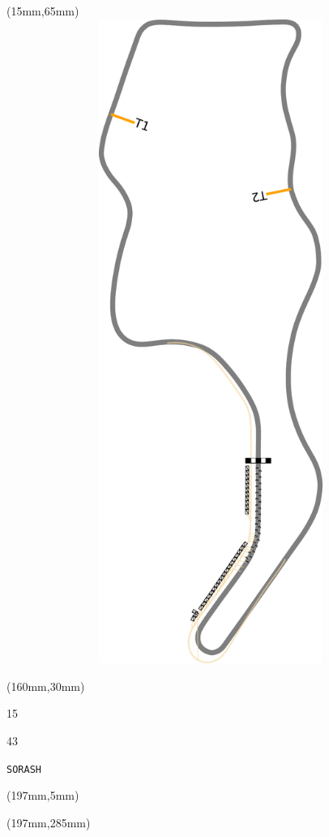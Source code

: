 \begin{textblock*}{185mm}(15mm,65mm)%
\centering
\mbox{\includegraphics[width=185mm,height=210mm,keepaspectratio]{PT/SORASH.pdf}}
\end{textblock*}
\begin{textblock*}{40mm}(160mm,30mm)%
\Large
\par{} 
\par15 
\par43 
\par\hfill\tiny\tt SORASH\\
\end{textblock*}
\begin{textblock*}{20mm}(197mm,5mm)%
\fbox{\thepage}
\label{SORASH}
\end{textblock*}
\begin{textblock*}{20mm}(197mm,285mm)%
\fbox{\thepage}
\end{textblock*}

